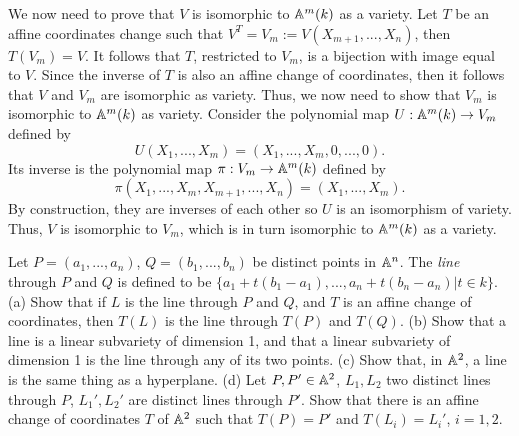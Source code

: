\begin{solution}
\begin{enumerate}[label=(\alph*)]
        We now need to prove that $V$ is isomorphic to $\mathbb{A}^m(k)$ as a variety. Let $T$ be an affine coordinates change such that $V^T = V_m := V(X_{m+1}, ..., X_n)$, then $T(V_m) = V$. It follows that $T$, restricted to $V_m$, is a bijection with image equal to $V$. Since the inverse of $T$ is also an affine change of coordinates, then it follows that $V$ and $V_m$ are isomorphic as variety. Thus, we now need to show that $V_m$ is isomorphic to $\mathbb{A}^m(k)$ as variety. Consider the polynomial map $U: \mathbb{A}^m(k) \to V_m$ defined by
        $$U(X_1, ..., X_m) = (X_1, ..., X_m, 0, ..., 0).$$
        Its inverse is the polynomial map $\pi : V_m \to \mathbb{A}^m(k)$ defined by
        $$\pi(X_1, ..., X_m, X_{m+1}, ..., X_n) = (X_1, ..., X_m).$$
        By construction, they are inverses of each other so $U$ is an isomorphism of variety. Thus, $V$ is isomorphic to $V_m$, which is in turn isomorphic to $\mathbb{A}^m(k)$ as a variety. \\
    \end{enumerate}
\end{solution}

\begin{exercise}
    Let $P = (a_1, ..., a_n)$, $Q = (b_1, ..., b_n)$ be distinct points in $\mathbb{A}^n$. The \textit{line} through $P$ and $Q$ is defined to be $\{a_1 + t(b_1 - a_1), ..., a_n + t(b_n - a_n) | t\in k\}$. (a) Show that if $L$ is the line through $P$ and $Q$, and $T$ is an affine change of coordinates, then $T(L)$ is the line through $T(P)$ and $T(Q)$. (b) Show that a line is a linear subvariety of dimension 1, and that a linear subvariety of dimension 1 is the line through any of its two points. (c) Show that, in $\mathbb{A}^2$, a line is the same thing as a hyperplane. (d) Let $P,P' \in \mathbb{A}^2$, $L_1,L_2$ two distinct lines through $P$, $L_1', L_2'$ are distinct lines through $P'$. Show that there is an affine change of coordinates $T$ of $\mathbb{A}^2$ such that $T(P) = P'$ and $T(L_i) = L_i'$, $i=1,2$. \\
\end{exercise}

